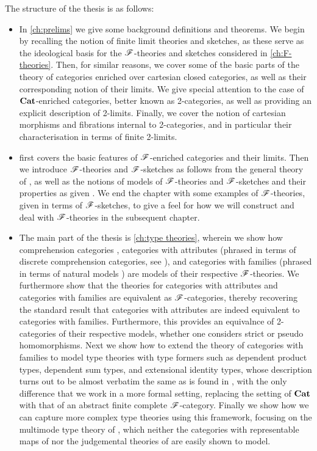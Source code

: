 \documentclass[../thesis.tex]{subfiles}
\begin{document}
The structure of the thesis is as follows:
\begin{itemize}
  \item In \cref{ch:prelims} we give some background definitions and theorems. We begin by recalling the notion of finite limit
    theories and sketches, as these serve as the ideological basis for the ${\mathscr{F}}$-theories and sketches considered in
    \cref{ch:F-theories}. Then, for similar reasons, we cover some of the basic parts of the theory of categories enriched
    over cartesian closed categories, as well as their corresponding notion of their limits. We give special attention to
    the case of ${\mathbf{Cat}}$-enriched categories, better known as 2-categories, as well as providing an explicit description of
    2-limits. Finally, we cover the notion of cartesian morphisms and fibrations internal to 2-categories, and in particular
    their characterisation in terms of finite 2-limits.

  \item {} first covers the basic features of ${\mathscr{F}}$-enriched categories and their limits. Then we introduce
    ${\mathscr{F}}$-theories and ${\mathscr{F}}$-sketches as follows from the general theory of \cite{kelly1982a}, as well as the notions of models
    of ${\mathscr{F}}$-theories and ${\mathscr{F}}$-sketches and their properties as given \cite{arkor2024}. We end the chapter with some examples
    of ${\mathscr{F}}$-theories, given in terms of ${\mathscr{F}}$-sketches, to give a feel for how we will construct and deal with ${\mathscr{F}}$-theories
    in the subsequent chapter.

  \item The main part of the thesis is \cref{ch:type theories}, wherein we show how comprehension categories \cite{jacobs1993},
    categories with attributes \cite{cartmell1978} (phrased in terms of discrete comprehension categories, see \cite{jacobs1993}),
    and categories with families \cite{dybjer1996} (phrased in terms of natural models \cite{awodey2017}) are models of their
    respective ${\mathscr{F}}$-theories. We furthermore show that the theories for categories with attributes and categories with families
    are equivalent as ${\mathscr{F}}$-categories, thereby recovering the standard result that categories with attributes are indeed
    equivalent to categories with families. Furthermore, this provides an equivalnce of 2-categories of their respective models,
    whether one considers strict or pseudo homomorphisms. Next we show how to extend the theory of categories with families to
    model type theories with type formers such as dependent product types, dependent sum types, and extensional identity types,
    whose description turns out to be almost verbatim the same as is found in \cite{coraglia2024a}, with the only difference that
    we work in a more formal setting, replacing the setting of ${\mathbf{Cat}}$ with that of an abstract finite complete ${\mathscr{F}}$-category.
    Finally we show how we can capture more complex type theories using this framework, focusing on the multimode type theory
    of \textcite{gratzer2021}, which neither the categories with representable maps of \cite{uemura2023} nor the judgemental
    theories of \cite{coraglia2024a} are easily shown to model.
\end{itemize}
\end{document}
